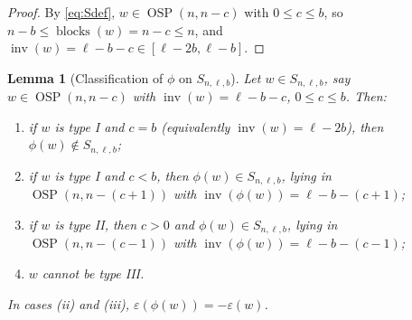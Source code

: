 \documentclass[11pt]{amsart}
\newtheorem{lemma}[theorem]{Lemma}
\theoremstyle{definition}
\DeclareMathOperator{\OSP}{OSP}
\DeclareMathOperator{\inv}{inv}
\DeclareMathOperator{\blocks}{blocks}
\begin{document}
\begin{proof}
By \eqref{eq:Sdef}, $w\in\OSP(n,n-c)$ with $0\le c\le b$, so
$n-b\le\blocks(w)=n-c\le n$, and $\inv(w)=\ell-b-c\in[\ell-2b,\ell-b]$.
\end{proof}

\begin{lemma}[Classification of $\phi$ on $S_{n,\ell,b}$]\label{lem:classify}
Let $w\in S_{n,\ell,b}$, say $w\in\OSP(n,n-c)$ with $\inv(w)=\ell-b-c$,
$0\le c\le b$. Then:
\begin{enumerate}[\rm(i)]
\item if $w$ is type I and $c=b$ (equivalently $\inv(w)=\ell-2b$), then
$\phi(w)\notin S_{n,\ell,b}$;
\item if $w$ is type I and $c<b$, then $\phi(w)\in S_{n,\ell,b}$, lying in
$\OSP(n,n-(c+1))$ with $\inv(\phi(w))=\ell-b-(c+1)$;
\item if $w$ is type II, then $c>0$ and $\phi(w)\in S_{n,\ell,b}$, lying in
$\OSP(n,n-(c-1))$ with $\inv(\phi(w))=\ell-b-(c-1)$;
\item $w$ cannot be type III.
\end{enumerate}
In cases (ii) and (iii), $\varepsilon(\phi(w))=-\varepsilon(w)$.
\end{lemma}
\end{document}
